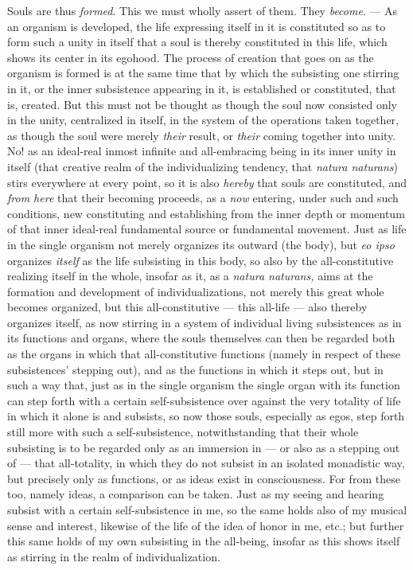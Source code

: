 \documentclass[12pt,a4paper,openany]{book}
\newcommand{\opage}[1]{\marginnote{\footnotesize\textit{[#1]}}}
\begin{document}
Souls are thus \emph{formed}. This we must wholly assert of them. They \emph{become}.
--- As an organism is developed, the life expressing itself in it is constituted so
as to form such a unity in itself that a soul is thereby constituted in this life,
which shows its center in its egohood. The process of creation that goes on as the
organism is formed is at the same time that by which the subsisting one stirring in
it, or the inner subsistence appearing in it, is established or constituted, that is,
created. But this must not be thought as though the soul now consisted only in the
unity, centralized in itself, in the system of the operations taken together, as
though the soul were merely \emph{their} result, or \emph{their} coming together into
unity. No! as an ideal-real inmost infinite and all-embracing being in its inner
unity in itself (that creative realm of the individualizing tendency, that
\textit{natura naturans}) stirs everywhere at every point, so it is also \emph{hereby}
that souls
\setcounter{footnote}{0}%
\opage{131}are constituted, and \emph{from here} that their becoming proceeds, as a
\emph{now} entering, under such and such conditions, new constituting and
establishing from the inner depth or momentum of that inner ideal-real fundamental
source or fundamental movement. Just as life in the single organism not merely
organizes its outward (the body), but \textit{eo ipso} organizes \emph{itself} as the
life subsisting in this body, so also by the all-constitutive realizing itself in the
whole, insofar as it, as a \textit{natura naturans,} aims at the formation and
development of individualizations, not merely this great whole becomes organized, but
this all-constitutive --- this all-life --- also thereby organizes itself, as now
stirring in a system of individual living subsistences as in its functions and
organs, where the souls themselves can then be regarded both as the organs in which
that all-constitutive functions (namely in respect of these subsistences' stepping
out), and as the functions in which it steps out, but in such a way that, just as in
the single organism the single organ with its function can step forth with a certain
self-subsistence over against the very totality of life in which it alone is and
subsists, so now those souls, especially as egos, step forth still more with such a
self-subsistence, notwithstanding that their whole subsisting is to be regarded only
as an immersion in --- or also as a stepping out of --- that all-totality, in which
they do not subsist in an isolated monadistic way, but precisely only as functions,
or as ideas exist in consciousness. For from these too, namely ideas, a comparison
can be taken. Just as my seeing and hearing subsist with a certain self-subsistence
in me, so the same holds also of my musical sense and interest, likewise of the life
of the idea of honor in me, etc.; but further this same holds of my own subsisting in
the all-being, insofar as this shows itself as stirring in the realm of
individualization.
\end{document}
